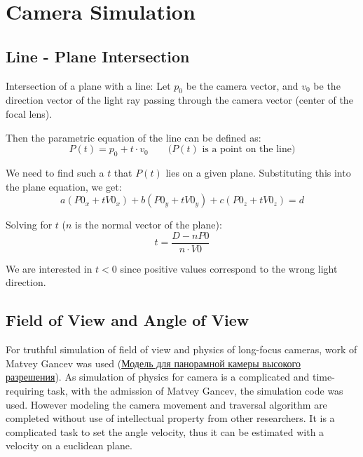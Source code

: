 
\section{Camera Simulation}
\subsection{Line - Plane Intersection}
Intersection of a plane with a line:
Let $p_0$ be the camera vector, and $v_0$ be the direction vector of the light ray passing through the camera vector (center of the focal lens).

Then the parametric equation of the line can be defined as:
$$P(t) = p_0 + t \cdot v_0 \qquad \text{($P(t)$ is a point on the line)}$$

We need to find such a $t$ that $P(t)$ lies on a given plane.
Substituting this into the plane equation, we get:
$$a(P0_x + tV0_x) + b(P0_y + tV0_y) + c(P0_z + tV0_z) = d$$

Solving for $t$ ($n$ is the normal vector of the plane):
$$t = \frac{D - nP0}{n \cdot V0}$$

We are interested in $t < 0$ since positive values correspond to the wrong light direction.

\subsection{Field of View and Angle of View}
For truthful simulation of field of view and physics of long-focus cameras, work of Matvey Gancev was used (\href{https://gitlab.car.cos.ru/mgantsev/diplomagm}{Модель для панорамной камеры высокого разрешения}). As simulation of physics for camera is a complicated and time-requiring task, with the admission of Matvey Gancev, the simulation code was used. However modeling the camera movement and traversal algorithm are completed without use of intellectual property from other researchers. It is a complicated task to set the angle velocity, thus it can be estimated with a velocity on a euclidean plane. 

